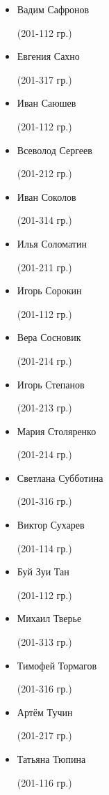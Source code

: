 \begin{multicols}{2}
\begin{small}
\begin{itemize}[leftmargin=*]
	\item[] Вадим Сафронов\begin{tiny} (201-112 гр.)\end{tiny}
	\item[] Евгения Сахно\begin{tiny} (201-317 гр.)\end{tiny} %
	\item[] Иван Саюшев\begin{tiny} (201-112 гр.)\end{tiny}
	\item[] Всеволод Сергеев\begin{tiny} (201-212 гр.)\end{tiny} %
	\item[] Иван Соколов\begin{tiny} (201-314 гр.)\end{tiny} %
	\item[] Илья Соломатин\begin{tiny} (201-211 гр.)\end{tiny}
	\item[] Игорь Сорокин\begin{tiny} (201-112 гр.)\end{tiny}
	\item[] Вера Сосновик\begin{tiny} (201-214 гр.)\end{tiny} %
	\item[] Игорь Степанов\begin{tiny} (201-213 гр.)\end{tiny}
	\item[] Мария Столяренко\begin{tiny} (201-214 гр.)\end{tiny}
	\item[] Светлана Субботина\begin{tiny} (201-316 гр.)\end{tiny} %
	\item[] Виктор Сухарев\begin{tiny} (201-114 гр.)\end{tiny} %

	\item[] Буй Зуи Тан\begin{tiny} (201-112 гр.)\end{tiny}
	\item[] Михаил Тверье\begin{tiny} (201-313 гр.)\end{tiny} %
	\item[] Тимофей Тормагов\begin{tiny} (201-316 гр.)\end{tiny} %
	\item[] Артём Тучин\begin{tiny} (201-217 гр.)\end{tiny} %
	\item[] Татьяна Тюпина\begin{tiny} (201-116 гр.)\end{tiny}


\end{itemize}
\end{small}
\end{multicols}
